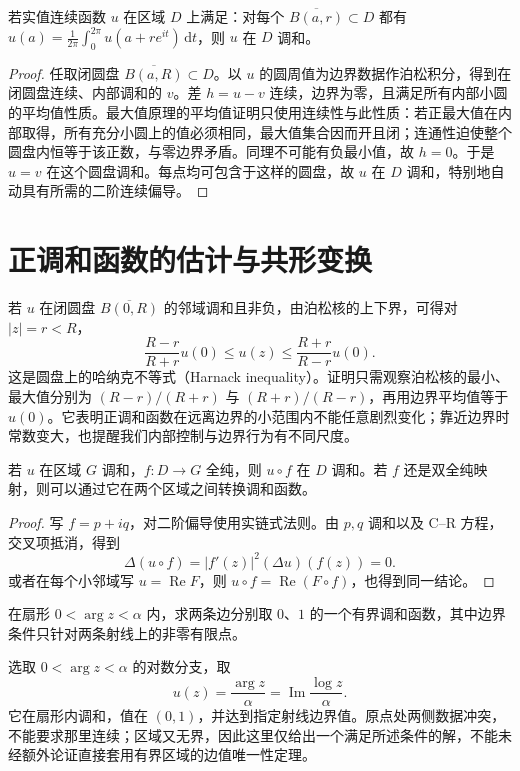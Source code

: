 \begin{proposition}[平均值性质刻画调和性]
\label{prop:ca-mean-characterization}
若实值连续函数 $u$ 在区域 $D$ 上满足：对每个 $\overline{B(a,r)}\subset D$ 都有 $u(a)=\frac1{2\pi}\int_0^{2\pi}u(a+re^{it})\,\mathrm dt$，则 $u$ 在 $D$ 调和。
\end{proposition}
\begin{proof}
任取闭圆盘 $\overline{B(a,R)}\subset D$。以 $u$ 的圆周值为边界数据作泊松积分，得到在闭圆盘连续、内部调和的 $v$。差 $h=u-v$ 连续，边界为零，且满足所有内部小圆的平均值性质。最大值原理的平均值证明只使用连续性与此性质：若正最大值在内部取得，所有充分小圆上的值必须相同，最大值集合因而开且闭；连通性迫使整个圆盘内恒等于该正数，与零边界矛盾。同理不可能有负最小值，故 $h=0$。于是 $u=v$ 在这个圆盘调和。每点均可包含于这样的圆盘，故 $u$ 在 $D$ 调和，特别地自动具有所需的二阶连续偏导。
\end{proof}

\section{正调和函数的估计与共形变换}

若 $u$ 在闭圆盘 $\overline{B(0,R)}$ 的邻域调和且非负，由泊松核的上下界，可得对 $|z|=r<R$，
\begin{equation}
 \frac{R-r}{R+r}u(0)\le u(z)\le\frac{R+r}{R-r}u(0).
 \label{eq:ca-harnack}
\end{equation}
这是圆盘上的哈纳克不等式（Harnack inequality）。证明只需观察泊松核的最小、最大值分别为 $(R-r)/(R+r)$ 与 $(R+r)/(R-r)$，再用边界平均值等于 $u(0)$。它表明正调和函数在远离边界的小范围内不能任意剧烈变化；靠近边界时常数变大，也提醒我们内部控制与边界行为有不同尺度。

\begin{proposition}[调和性的共形不变性]
若 $u$ 在区域 $G$ 调和，$f:D\to G$ 全纯，则 $u\circ f$ 在 $D$ 调和。若 $f$ 还是双全纯映射，则可以通过它在两个区域之间转换调和函数。
\end{proposition}
\begin{proof}
写 $f=p+iq$，对二阶偏导使用实链式法则。由 $p,q$ 调和以及 C--R 方程，交叉项抵消，得到
\[
 \Delta(u\circ f)=|f'(z)|^2(\Delta u)(f(z))=0.
\]
或者在每个小邻域写 $u=\operatorname{Re}F$，则 $u\circ f=\operatorname{Re}(F\circ f)$，也得到同一结论。
\end{proof}

\begin{example}[扇形上的边界值]
在扇形 $0<\arg z<\alpha$ 内，求两条边分别取 $0$、$1$ 的一个有界调和函数，其中边界条件只针对两条射线上的非零有限点。
\end{example}
\begin{solve}
选取 $0<\arg z<\alpha$ 的对数分支，取
\[
 u(z)=\frac{\arg z}{\alpha}=\operatorname{Im}\frac{\log z}{\alpha}.
\]
它在扇形内调和，值在 $(0,1)$，并达到指定射线边界值。原点处两侧数据冲突，不能要求那里连续；区域又无界，因此这里仅给出一个满足所述条件的解，不能未经额外论证直接套用有界区域的边值唯一性定理。
\end{solve}

